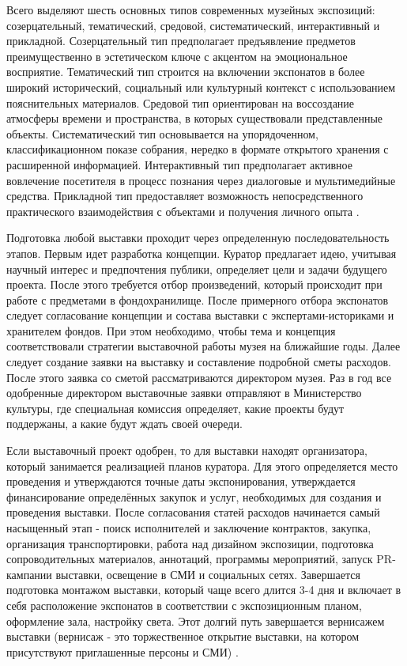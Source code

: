 Всего выделяют шесть основных типов современных музейных экспозиций: созерцательный, тематический, средовой, систематический, интерактивный и прикладной. Созерцательный тип предполагает предъявление предметов преимущественно в эстетическом ключе с акцентом на эмоциональное восприятие. Тематический тип строится на включении экспонатов в более широкий исторический, социальный или культурный контекст с использованием пояснительных материалов. Средовой тип ориентирован на воссоздание атмосферы времени и пространства, в которых существовали представленные объекты. Систематический тип основывается на упорядоченном, классификационном показе собрания, нередко в формате открытого хранения с расширенной информацией. Интерактивный тип предполагает активное вовлечение посетителя в процесс познания через диалоговые и мультимедийные средства. Прикладной тип предоставляет возможность непосредственного практического взаимодействия с объектами и получения личного опыта \cite{site:sources3}. \par

Подготовка любой выставки проходит через определенную последовательность этапов. Первым идет разработка концепции. Куратор предлагает идею, учитывая научный интерес и предпочтения публики, определяет цели и задачи будущего проекта. После этого требуется отбор произведений, который происходит при работе с предметами в фондохранилище. После примерного отбора экспонатов следует согласование концепции и состава выставки с экспертами-историками и хранителем фондов. При этом необходимо, чтобы тема и концепция соответствовали стратегии выставочной работы музея на ближайшие годы. Далее следует создание заявки на выставку и составление подробной сметы расходов. После этого заявка со сметой рассматриваются директором музея. Раз в год все одобренные директором выставочные заявки отправляют в Министерство культуры, где специальная комиссия определяет, какие проекты будут поддержаны, а какие будут ждать своей очереди. \par

Если выставочный проект одобрен, то для выставки находят организатора, который занимается реализацией планов куратора.  Для этого определяется место проведения и утверждаются точные даты экспонирования, утверждается финансирование определённых закупок и услуг, необходимых для создания и проведения выставки. После согласования статей расходов начинается самый насыщенный этап - поиск исполнителей и заключение контрактов, закупка, организация транспортировки, работа над дизайном экспозиции, подготовка сопроводительных материалов, аннотаций, программы мероприятий, запуск PR-кампании выставки, освещение в СМИ и социальных сетях. Завершается подготовка монтажом выставки, который чаще всего длится 3-4 дня и включает в себя расположение экспонатов в соответствии с экспозиционным планом, оформление зала, настройку света. Этот долгий путь завершается вернисажем выставки (вернисаж - это торжественное открытие выставки, на котором присутствуют приглашенные персоны и СМИ) \cite{site:sources4}. \par


